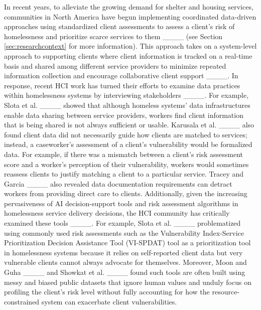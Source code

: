 In recent years, to alleviate the growing demand for shelter and housing services, communities in North America have begun implementing coordinated data-driven approaches using standardized client assessments to assess a client's risk of homelessness and prioritize scarce services to them ____ (see Section \ref{sec:researchcontext} for more information). This approach takes on a system-level approach to supporting clients where client information is tracked on a real-time basis and shared among different service providers to minimize repeated information collection and encourage collaborative client support ____. In response, recent HCI work has turned their efforts to examine data practices within homelessness systems by interviewing stakeholders ____. For example, Slota et al. ____ showed that although homeless systems' data infrastructures enable data sharing between service providers, workers find client information that is being shared is not always sufficient or usable. Karusala et al. ____ also found client data did not necessarily guide how clients are matched to services; instead, a caseworker's assessment of a client's vulnerability would be formalized  data. For example, if there was a mismatch between a client's risk assessment score and a worker's perception of their vulnerability, workers would sometimes reassess clients to justify matching a client to a particular service. Tracey and Garcia ____ also revealed data documentation requirements can detract workers from providing direct care to clients. Additionally, given the increasing pervasiveness of AI decision-support tools and risk assessment algorithms in homelessness service delivery decisions, the HCI community has critically examined these tools ____. For example, Slota et al. ____ problematized using commonly used risk assessments such as the Vulnerability Index-Service Prioritization Decision Assistance Tool (VI-SPDAT) tool as a prioritization tool in homelessness systems because it relies on self-reported client data but very vulnerable clients cannot always advocate for themselves. Moreover, Moon and Guha ____ and Showkat et al. ____ found such tools are often built using messy and biased public datasets that ignore human values and unduly focus on profiling the client's risk level without fully accounting for how the resource-constrained system can exacerbate client vulnerabilities. 


